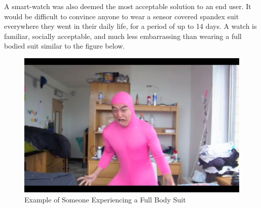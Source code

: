 \documentclass[12pt, titlepage]{article}
\begin{document}
\begin{enumerate}
A smart-watch was also deemed the most acceptable solution to an end user. It would be difficult to convince anyone to wear a sensor covered spandex suit everywhere they went in their daily life, for a period of up to 14 days. A watch is familiar, socially acceptable, and much less embarrassing than wearing a full bodied suit similar to the figure below.

\end{enumerate}

\begin{figure}[H]
	\begin{center}
		 \includegraphics[width=1\textwidth]{Pink}
		\caption{Example of Someone Experiencing a Full Body Suit}
		\label{Pink} 
	\end{center}
\end{figure}
\end{document}
